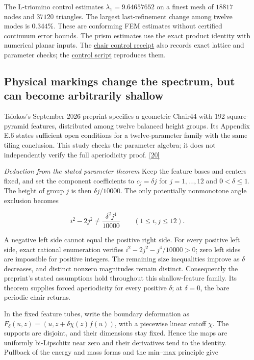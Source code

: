 \documentclass[11pt]{article}
\begin{document}
The L-triomino control estimates \(\lambda_1=9.64657652\) on a finest mesh of \(18817\) nodes and \(37120\) triangles. The largest last-refinement change among twelve modes is \(0.344\%\). These are conforming FEM estimates without certified continuum error bounds. The prism estimates use the exact product identity with numerical planar inputs. The \href{../../research/spectral-tiling/chair-control.json}{chair control receipt} also records exact lattice and parameter checks; the \href{../../research/spectral-tiling/chair_control.py}{control script} reproduces them.



\subsection*{Physical markings change the spectrum, but can become arbitrarily shallow}


Tsiokos's September 2026 preprint specifies a geometric Chair44 with 192 square-pyramid features, distributed among twelve balanced height groups. Its Appendix E.6 states sufficient open conditions for a twelve-parameter family with the same tiling conclusion. This study checks the parameter algebra; it does not independently verify the full aperiodicity proof. \hyperlink{ref20}{[20]}



\textit{Deduction from the stated parameter theorem} Keep the feature bases and centers fixed, and set the component coefficients to \(c_j=\delta j\) for \(j=1,\ldots,12\) and \(0<\delta\le1\). The height of group \(j\) is then \(\delta j/10000\). The only potentially nonmonotone angle exclusion becomes


\[ i^2-2j^2\ne\frac{\delta^2j^4}{10000}\qquad(1\le i,j\le12). \]

A negative left side cannot equal the positive right side. For every positive left side, exact rational enumeration verifies \(i^2-2j^2-j^4/10000>0\); zero left sides are impossible for positive integers. The remaining size inequalities improve as \(\delta\) decreases, and distinct nonzero magnitudes remain distinct. Consequently the preprint's stated assumptions hold throughout this shallow-feature family. Its theorem supplies forced aperiodicity for every positive \(\delta\); at \(\delta=0\), the bare periodic chair returns.



In the fixed feature tubes, write the boundary deformation as \(F_\delta(u,z)=(u,z+\delta\chi(z)f(u))\), with a piecewise linear cutoff \(\chi\). The supports are disjoint, and their dimensions stay fixed. Hence the maps are uniformly bi-Lipschitz near zero and their derivatives tend to the identity. Pullback of the energy and mass forms and the min--max principle give
\end{document}
